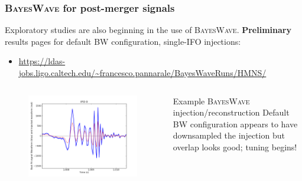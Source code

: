 \documentclass{beamer}
\begin{document}
\begin{frame}
    \frametitle{\textsc{BayesWave} for post-merger signals}
    Exploratory studies are also beginning in the use of \textsc{BayesWave}.
    {\bf Preliminary} results pages for default BW configuration, single-IFO
    injections:
    \begin{itemize}
        \item {\small
    \href{https://ldas-jobs.ligo.caltech.edu/~francesco.pannarale/BayesWaveRuns/HMNS/}{https://ldas-jobs.ligo.caltech.edu/\textasciitilde{}francesco.pannarale/BayesWaveRuns/HMNS/}}
    \end{itemize}

    \begin{columns}[]
        \begin{figure}
            \vspace*{-0.5cm}

            \begin{center}
                \includegraphics[scale=0.3]{signal_waveform_0.png} 
            \end{center}

        \end{figure}


        \begin{block}{Example \textsc{BayesWave} injection/reconstruction}
            Default BW configuration appears to have downsampled the
            injection but overlap looks good; tuning begins!
        \end{block}


    \end{columns}

\end{frame}
\end{document}
